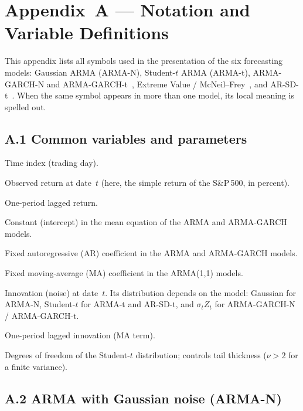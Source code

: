 \section*{Appendix~A --- Notation and Variable Definitions}
\label{annexe:notations}

This appendix lists all symbols used in the presentation of the six forecasting models: Gaussian ARMA (ARMA-N), Student-$t$ ARMA (ARMA-t), ARMA-GARCH-N and ARMA-GARCH-t~\cite{Bollerslev1986}, Extreme Value / McNeil--Frey~\cite{McNeilFrey2000}, and AR-SD-t~\cite{DelleMonachePetrella2017}. When the same symbol appears in more than one model, its local meaning is spelled out.

\subsection*{A.1 Common variables and parameters}

\begin{description}[style=nextline,leftmargin=2.2cm,labelwidth=2cm]
  \item[$t$]
    Time index (trading day).
  \item[$Y_t$]
    Observed return at date~$t$ (here, the simple return of the S\&P\,500, in percent).
  \item[$Y_{t-1}$]
    One-period lagged return.
  \item[$c$]
    Constant (intercept) in the mean equation of the ARMA and ARMA-GARCH models.
  \item[$\varphi$]
    Fixed autoregressive (AR) coefficient in the ARMA and ARMA-GARCH models.
  \item[$\theta$]
    Fixed moving-average (MA) coefficient in the ARMA(1,1) models.
  \item[$W_t$]
    Innovation (noise) at date~$t$. Its distribution depends on the model:
    Gaussian for ARMA-N, Student-$t$ for ARMA-t and AR-SD-t,
    and $\sigma_t Z_t$ for ARMA-GARCH-N / ARMA-GARCH-t.
  \item[$W_{t-1}$]
    One-period lagged innovation (MA term).
  \item[$\nu$]
    Degrees of freedom of the Student-$t$ distribution; controls tail thickness
    ($\nu > 2$ for a finite variance).
\end{description}

\subsection*{A.2 ARMA with Gaussian noise (ARMA-N)}

